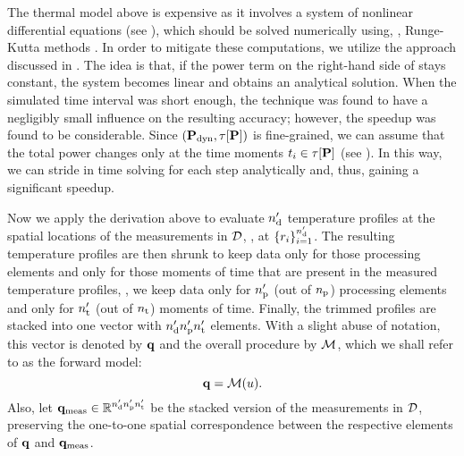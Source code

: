 



The thermal model above is expensive as it involves a system of nonlinear differential equations (see ), which should be solved numerically using, \eg, Runge-Kutta methods \cite{press2007}. In order to mitigate these computations, we utilize the approach discussed in \cite{ukhov2012}.
The idea is that, if the power term on the right-hand side of  stays constant, the system becomes linear and obtains an analytical solution. When the simulated time interval was short enough, the technique was found to have a negligibly small influence on the resulting accuracy; however, the speedup was found to be considerable.
Since $(\mathbf{P}_{\text{dyn}}, \tau[\mathbf{P}])$ is fine-grained, we can assume that the total power changes only at the time moments $t_i \in \tau[\mathbf{P}]$ (see ). In this way, we can stride in time solving  for each step analytically and, thus, gaining a significant speedup.

Now we apply the derivation above to evaluate ${n_\text{d}'}$ temperature profiles at the spatial locations of the measurements in $\mathcal{D}$, \ie, at $\{ r_i \}_{i = 1}^{n_\text{d}'}$. The resulting temperature profiles are then shrunk to keep data only for those processing elements and only for those moments of time that are present in the measured temperature profiles, \ie, we keep data only for ${n_\text{p}'}$ (out of ${n_\text{p}}$) processing elements and only for ${n_\text{t}'}$ (out of ${n_\text{t}}$) moments of time. Finally, the trimmed profiles are stacked into one vector with ${n_\text{d}'} {n_\text{p}'} {n_\text{t}'}$ elements. With a slight abuse of notation, this vector is denoted by $\mathbf{q}$ and the overall procedure by $\model$, which we shall refer to as the forward model:
\begin{equation} \elabel{model}
  \mvT = \model{\u}.
\end{equation}
Also, let $\mathbf{q}_{\text{meas}} \in \mathbb{R}^{{n_\text{d}'} {n_\text{p}'} {n_\text{t}'}}$ be the stacked version of the measurements in $\mathcal{D}$, preserving the one-to-one spatial correspondence between the respective elements of $\mathbf{q}$ and $\mathbf{q}_{\text{meas}}$.
